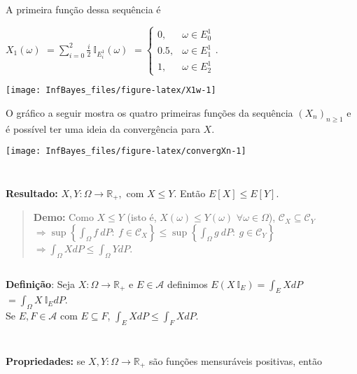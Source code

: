 \documentclass[
]{book}
\begin{document}
\(~\)

A primeira função dessa sequência é

\(X_1(\omega)\)
\(= \displaystyle\sum_{i=0}^2 \frac{i}{2}~\mathbb{I}_{{E}_i^1}(\omega)\)
\(=\displaystyle\left\{\begin{array}{ll}0,&\omega\in{E}_0^1\\ 0.5,&\omega\in{E}_1^1\\1,&\omega\in{E}_2^1 \end{array}\right.\).

\begin{center}\texttt{[image: InfBayes\_files/figure-latex/X1w-1]} \end{center}

O gráfico a seguir mostra os quatro primeiras funções da sequência \(\left(X_n\right)_{n\geq 1}\) e é possível ter uma ideia da convergência para \(X\).

\begin{center}\texttt{[image: InfBayes\_files/figure-latex/convergXn-1]} \end{center}

\(~\)

\(~\)

\textbf{Resultado:} \(X,Y: \Omega \longrightarrow\mathbb{R}_+,\) com \(X\leq Y\). Então \(E[X] \leq E[Y]\).

\begin{quote}
\textbf{Demo:} Como \(X \leq Y\) (isto é, \(X(\omega) \leq Y(\omega)\) \(\forall \omega \in \Omega\)), \(\mathcal{C}_X \subseteq \mathcal{C}_Y\)\\
\(\Rightarrow \sup\left\{\displaystyle\int_\Omega f~dP:~ f\in \mathcal{C}_X\right\} \leq \sup\left\{\displaystyle\int_\Omega g~dP:~ g\in \mathcal{C}_Y\right\}\) \(\Rightarrow \displaystyle\int_\Omega XdP \leq \displaystyle\int_\Omega YdP\).
\end{quote}

\(~\)

\textbf{Definição}: Seja \(X:\Omega \longrightarrow\mathbb{R}_+\) e \(E \in \mathcal{A}\) definimos \(E(X~\mathbb{I}_E) = \displaystyle\int_EXdP\) \(=\displaystyle\int_\Omega X~\mathbb{I}_EdP\).\\
Se \(E,F \in \mathcal{A}\) com \(E\subseteq F\), \(\displaystyle\int_E XdP \leq \int_F XdP.\)

\(~\)

\(~\)

\textbf{Propriedades:} se \(X, Y: \Omega \longrightarrow \mathbb{R}_+\) são funções mensuráveis positivas, então
\end{document}
